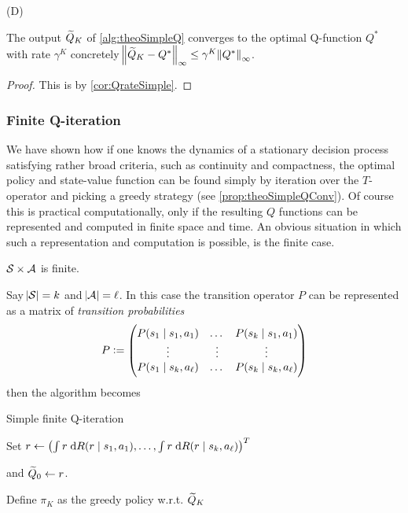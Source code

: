 \begin{prop}(D)

  The output $\widetilde{Q}_K$ of \cref{alg:theoSimpleQ} converges to the optimal
  Q-function $Q^*$ with rate $\gamma^K$ concretely
  $\norm{\widetilde{Q}_K - Q^*}_\infty \leq \gamma^K \norm{Q^*}_\infty$.
  \label{prop:theoSimpleQConv}
\end{prop}
\begin{proof}
  This is by \cref{cor:QrateSimple}.
\end{proof}

\subsubsection{Finite Q-iteration}
We have shown how if one knows the dynamics
of a stationary decision process satisfying rather broad criteria, 
such as continuity and compactness,
the optimal policy and state-value function can be found
simply by iteration over the $T$-operator and picking a greedy strategy
(see \cref{prop:theoSimpleQConv}).
Of course this is practical computationally, only if
the resulting $Q$ functions can be represented and computed in finite
space and time.
An obvious situation in which such a representation and computation is possible,
is the finite case.
\begin{asm}
  $\mathcal{S}\times\mathcal{A}$ is finite.
  \label{asm:finite}
\end{asm}
Say $\abs{\mathcal{S}} = k$ and $\abs{\mathcal{A}} = \ell$.
In this case the transition operator $P$ can be represented as a
matrix of \emph{transition probabilities}
\[ P \vcentcolon= \begin{pmatrix}
    P(s_1 \mid s_1, a_1) & \dots & P(s_k \mid s_1, a_1)
    \\ \vdots & \vdots & \vdots
    \\ P(s_1 \mid s_k, a_\ell) & \dots & P(s_k \mid s_k, a_\ell)
\end{pmatrix} \]
then the algorithm becomes

\begin{algorithm}[H] %
\caption{Simple finite Q-iteration}
Set $ r \leftarrow \left(\int r \; \mathrm{d} R(r \mid s_1, a_1),
\dots, \int r \; \mathrm{d} R(r \mid s_k, a_\ell) \right)^T $

and $ \widetilde{Q}_0 \leftarrow r$.

Define $\pi_K$ as the greedy policy w.r.t. $\widetilde{Q}_K$ \\
\label{alg:finiteSimpleQ}
\end{algorithm}

